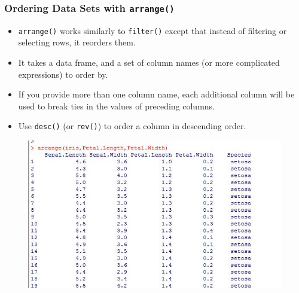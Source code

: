 \documentclass{beamer}
\begin{document}
	

	\begin{frame}
		\frametitle{Ordering Data Sets with \texttt{arrange()}}
		\Large
		\begin{itemize}
			\item \texttt{arrange()} works similarly to \texttt{filter()} except that instead of filtering or selecting rows, it reorders them. 
			
			\item It takes a data frame, and a set of column names (or more complicated expressions) to order by.
			
			\item If you provide more than one column name, each additional column will be used to break ties in the values of preceding columns.
			
			\item Use \texttt{desc()} (or \texttt{rev()}) to order a column in descending order.
			
		\end{itemize}
	\end{frame}
	\begin{frame}
		\begin{figure}
			\centering
			\includegraphics[width=0.97\linewidth]{images/irisarrange}
			
		\end{figure}
		
	\end{frame}
	
	
\end{document}
